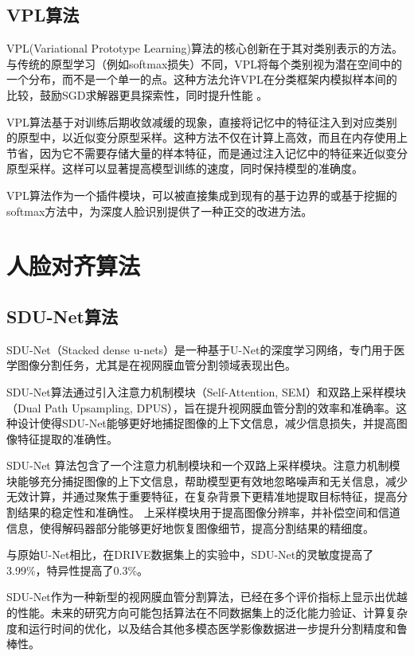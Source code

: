 \documentclass[a4paper]{article}
\begin{document}
\subsection{VPL算法}

VPL(Variational Prototype Learning)算法的核心创新在于其对类别表示的方法。与传统的原型学习（例如softmax损失）不同，VPL将每个类别视为潜在空间中的一个分布，而不是一个单一的点。这种方法允许VPL在分类框架内模拟样本间的比较，鼓励SGD求解器更具探索性，同时提升性能 \cite{deng2021variational}。

VPL算法基于对训练后期收敛减缓的现象，直接将记忆中的特征注入到对应类别的原型中，以近似变分原型采样。这种方法不仅在计算上高效，而且在内存使用上节省，因为它不需要存储大量的样本特征，而是通过注入记忆中的特征来近似变分原型采样。这样可以显著提高模型训练的速度，同时保持模型的准确度。

VPL算法作为一个插件模块，可以被直接集成到现有的基于边界的或基于挖掘的softmax方法中，为深度人脸识别提供了一种正交的改进方法。


\section{人脸对齐算法}

\subsection{SDU-Net算法}

SDU-Net（Stacked dense u-nets）是一种基于U-Net的深度学习网络，专门用于医学图像分割任务，尤其是在视网膜血管分割领域表现出色\cite{guo2018stacked}。

SDU-Net算法通过引入注意力机制模块（Self-Attention, SEM）和双路上采样模块（Dual Path Upsampling, DPUS），旨在提升视网膜血管分割的效率和准确率。这种设计使得SDU-Net能够更好地捕捉图像的上下文信息，减少信息损失，并提高图像特征提取的准确性。

SDU-Net 算法包含了一个注意力机制模块和一个双路上采样模块。注意力机制模块能够充分捕捉图像的上下文信息，帮助模型更有效地忽略噪声和无关信息，减少无效计算，并通过聚焦于重要特征，在复杂背景下更精准地提取目标特征，提高分割结果的稳定性和准确性。
上采样模块用于提高图像分辨率，并补偿空间和信道信息，使得解码器部分能够更好地恢复图像细节，提高分割结果的精细度。

与原始U-Net相比，在DRIVE数据集上的实验中，SDU-Net的灵敏度提高了3.99\%，特异性提高了0.3\%。

SDU-Net作为一种新型的视网膜血管分割算法，已经在多个评价指标上显示出优越的性能。未来的研究方向可能包括算法在不同数据集上的泛化能力验证、计算复杂度和运行时间的优化，以及结合其他多模态医学影像数据进一步提升分割精度和鲁棒性。
\end{document}
